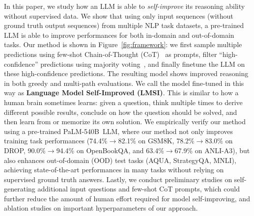\documentclass{article} %
\newcommand{\bigmodel}{PaLM-540B}
\begin{document}
In this paper, we study how an LLM is able to \textit{self-improve} its reasoning ability without supervised data. We show that using only
input sequences (without ground truth output sequences) from multiple NLP task datasets, a pre-trained LLM is able to improve performances for both in-domain and out-of-domain tasks. 
Our method is shown in Figure~\ref{fig:framework}: we first sample multiple predictions using few-shot Chain-of-Thought (CoT)~\citep{Wei2022ChainOT} as prompts, filter ``high-confidence'' predictions using majority voting~\citep{Wang2022SelfConsistencyIC}, and finally finetune the LLM on these high-confidence predictions. The resulting model shows improved reasoning in both greedy and multi-path evaluations.
We call the model fine-tuned in this way as \textbf{Language Model Self-Improved (LMSI)}. This is similar to how a human brain sometimes learns: given a question, think multiple times to derive different possible results, conclude on how the question should be solved, and then learn from or memorize its own solution.
We empirically verify our method using a pre-trained \bigmodel~LLM, where our method not only improves training task performances (74.4\%$\rightarrow$82.1\% on GSM8K, 78.2\%$\rightarrow$83.0\% on DROP, 90.0\%$\rightarrow$94.4\% on OpenBookQA, and 63.4\%$\rightarrow$67.9\% on ANLI-A3), but also enhances out-of-domain (OOD) test tasks (AQUA, 
StrategyQA, 
MNLI), achieving state-of-the-art performances in many tasks without relying on supervised ground truth answers. Lastly, we conduct preliminary studies on self-generating additional input questions and few-shot CoT prompts, which could further reduce the amount of human effort required for model self-improving, and ablation studies on important hyperparameters of our approach. 
\end{document}
